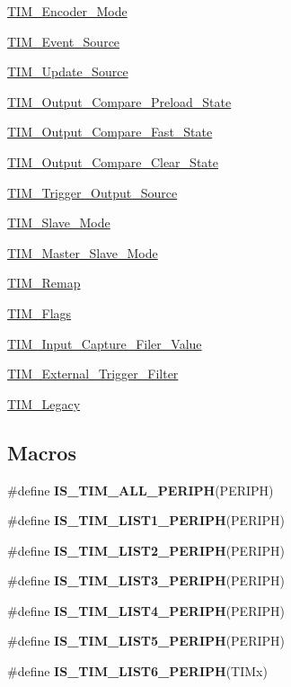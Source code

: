 \begin{DoxyCompactItemize}
\hyperlink{group___t_i_m___encoder___mode}{T\+I\+M\+\_\+\+Encoder\+\_\+\+Mode}
\item 
\hyperlink{group___t_i_m___event___source}{T\+I\+M\+\_\+\+Event\+\_\+\+Source}
\item 
\hyperlink{group___t_i_m___update___source}{T\+I\+M\+\_\+\+Update\+\_\+\+Source}
\item 
\hyperlink{group___t_i_m___output___compare___preload___state}{T\+I\+M\+\_\+\+Output\+\_\+\+Compare\+\_\+\+Preload\+\_\+\+State}
\item 
\hyperlink{group___t_i_m___output___compare___fast___state}{T\+I\+M\+\_\+\+Output\+\_\+\+Compare\+\_\+\+Fast\+\_\+\+State}
\item 
\hyperlink{group___t_i_m___output___compare___clear___state}{T\+I\+M\+\_\+\+Output\+\_\+\+Compare\+\_\+\+Clear\+\_\+\+State}
\item 
\hyperlink{group___t_i_m___trigger___output___source}{T\+I\+M\+\_\+\+Trigger\+\_\+\+Output\+\_\+\+Source}
\item 
\hyperlink{group___t_i_m___slave___mode}{T\+I\+M\+\_\+\+Slave\+\_\+\+Mode}
\item 
\hyperlink{group___t_i_m___master___slave___mode}{T\+I\+M\+\_\+\+Master\+\_\+\+Slave\+\_\+\+Mode}
\item 
\hyperlink{group___t_i_m___remap}{T\+I\+M\+\_\+\+Remap}
\item 
\hyperlink{group___t_i_m___flags}{T\+I\+M\+\_\+\+Flags}
\item 
\hyperlink{group___t_i_m___input___capture___filer___value}{T\+I\+M\+\_\+\+Input\+\_\+\+Capture\+\_\+\+Filer\+\_\+\+Value}
\item 
\hyperlink{group___t_i_m___external___trigger___filter}{T\+I\+M\+\_\+\+External\+\_\+\+Trigger\+\_\+\+Filter}
\item 
\hyperlink{group___t_i_m___legacy}{T\+I\+M\+\_\+\+Legacy}
\end{DoxyCompactItemize}
\subsection*{Macros}
\begin{DoxyCompactItemize}
\item 
\#define {\bfseries I\+S\+\_\+\+T\+I\+M\+\_\+\+A\+L\+L\+\_\+\+P\+E\+R\+I\+PH}(P\+E\+R\+I\+PH)
\item 
\#define {\bfseries I\+S\+\_\+\+T\+I\+M\+\_\+\+L\+I\+S\+T1\+\_\+\+P\+E\+R\+I\+PH}(P\+E\+R\+I\+PH)
\item 
\#define {\bfseries I\+S\+\_\+\+T\+I\+M\+\_\+\+L\+I\+S\+T2\+\_\+\+P\+E\+R\+I\+PH}(P\+E\+R\+I\+PH)
\item 
\#define {\bfseries I\+S\+\_\+\+T\+I\+M\+\_\+\+L\+I\+S\+T3\+\_\+\+P\+E\+R\+I\+PH}(P\+E\+R\+I\+PH)
\item 
\#define {\bfseries I\+S\+\_\+\+T\+I\+M\+\_\+\+L\+I\+S\+T4\+\_\+\+P\+E\+R\+I\+PH}(P\+E\+R\+I\+PH)
\item 
\#define {\bfseries I\+S\+\_\+\+T\+I\+M\+\_\+\+L\+I\+S\+T5\+\_\+\+P\+E\+R\+I\+PH}(P\+E\+R\+I\+PH)
\item 
\#define {\bfseries I\+S\+\_\+\+T\+I\+M\+\_\+\+L\+I\+S\+T6\+\_\+\+P\+E\+R\+I\+PH}(T\+I\+Mx)
\end{DoxyCompactItemize}


